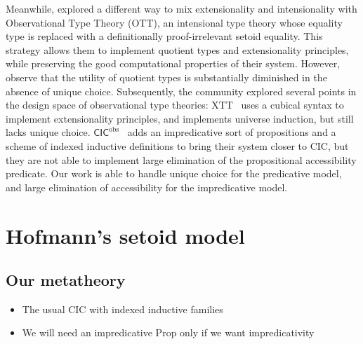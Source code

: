 \documentclass[acmsmall,screen,review]{acmart}
\begin{document}
Meanwhile, \citet{altenkirchAl:plpv2007} explored a different way to mix extensionality and
intensionality with Observational Type Theory (OTT), an intensional type theory
whose equality type is replaced with a definitionally proof-irrelevant setoid
equality.
%
This strategy allows them to implement quotient types and extensionality
principles, while preserving the good computational properties of their system.
%
However, \citet{xtt} observe that the utility of quotient types is substantially
diminished in the absence of unique choice.
%
Subsequently, the community explored several points in the design space of
observational type theories:
%
XTT~\citep{xtt} uses a cubical syntax to implement extensionality principles,
and implements universe induction, but still lacks unique choice.
%
\( \mathsf{CIC}^{\mathrm{obs}} \)~\citep{pujet:hal-03367052} adds an
impredicative sort of propositions and a scheme of indexed inductive definitions
to bring their system closer to CIC, but they are not able to implement large
elimination of the propositional accessibility predicate.
%
Our work is able to handle unique choice for the predicative model, and large
elimination of accessibility for the impredicative model.

%


\section{Hofmann's setoid model}

\subsection{Our metatheory}

\begin{itemize}
\item The usual CIC with indexed inductive families
\item We will need an impredicative Prop only if we want impredicativity
\end{itemize}
\end{document}
